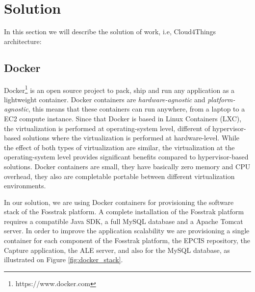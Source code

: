 \section{Solution}
\label{sec:solution}
In this section we will describe the solution of work, i.e, Cloud4Things architecture:
\subsection{Docker}
\label{sub:docker}
Docker\footnote{https://www.docker.com} is an open source project to pack, ship and run any application
as a lightweight container. Docker containers are \textit{hardware-agnostic} and \textit{platform-agnostic},
this means that these containers can run anywhere, from a laptop to a EC2 compute instance. Since that Docker
is based in Linux Containers (LXC), the virtualization is performed at operating-system level, different of
hypervisor-based solutions where the virtualization is performed at hardware-level. While the effect of both
types of virtualization are similar, the virtualization at the operating-system level provides significant
benefits compared to hypervisor-based solutions. Docker containers are small, they have basically zero
memory and CPU overhead, they also are completable portable between different virtualization environments.

In our solution, we are using Docker containers for provisioning the software stack of the Fosstrak platform.
A complete installation of the Fosstrak platform requires a compatible Java SDK, a full MySQL database and
a Apache Tomcat server. In order to improve the application scalability we are provisioning a single container
for each component of the Fosstrak platform, the EPCIS repository, the Capture application, the ALE server,
and also for the MySQL database, as illustrated on Figure \ref{fig:docker_stack}.

